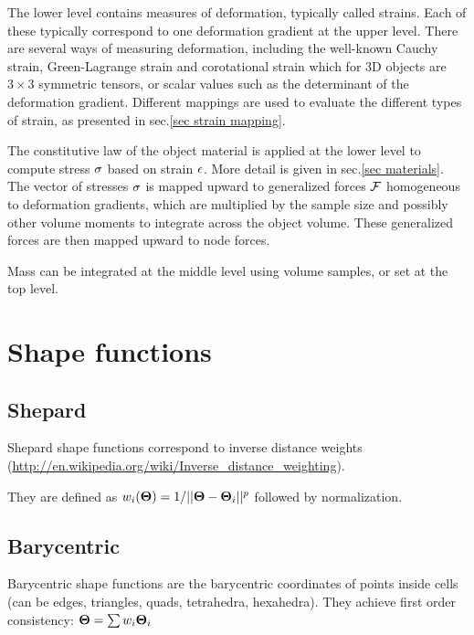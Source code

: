 The lower level contains measures of deformation, typically called strains.
Each of these typically correspond to one deformation gradient at the upper level.
There are several ways of measuring deformation, including the well-known Cauchy strain, Green-Lagrange strain and corotational strain which for 3D objects are $3 \times 3$ symmetric tensors, or scalar values such as the determinant of the deformation gradient.
Different mappings are used to evaluate the different types of strain, as presented in sec.\ref{sec strain mapping}.

The constitutive law of the object material is applied at the lower level to compute stress $\sigma$ based on strain $\epsilon$. 
More detail is given in sec.\ref{sec materials}.
The vector of stresses $\mathbf{{\sigma}}$ is mapped upward to generalized forces $\mathbf{{\mathcal{F}}}$ homogeneous to deformation gradients, which are multiplied by the sample size and possibly other volume moments to integrate across the object volume.
These generalized forces are then mapped upward to node forces.


Mass can be integrated at the middle level using volume samples, or set at the top level.







\section{Shape functions} \label{sec shape functions}

\subsection{Shepard}

Shepard shape functions correspond to inverse distance weights (\url{http://en.wikipedia.org/wiki/Inverse_distance_weighting}).

They are defined as $w_i(\mathbf{{\Theta}})=1/|| \mathbf{{\Theta}}-\mathbf{{\Theta}}_i ||^p$ followed by normalization.

\subsection{Barycentric}

Barycentric shape functions are the barycentric coordinates of points inside cells (can be edges, triangles, quads, tetrahedra, hexahedra).
They achieve first order consistency: $\mathbf{{\Theta}}= \sum w_i \mathbf{{\Theta}}_i$
 
